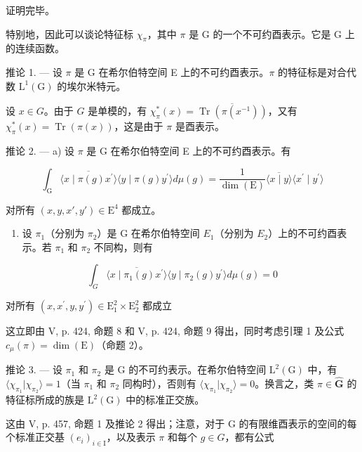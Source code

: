 证明完毕。

特别地，因此可以谈论特征标 \(\chi_{\pi}\)，其中 \(\pi\) 是 G 的一个不可约酉表示。它是 G 上的连续函数。

推论 1. --- 设 \(\pi\) 是 G 在希尔伯特空间 E 上的不可约酉表示。\(\pi\) 的特征标是对合代数 \(\mathrm{L}^{1}(\mathrm{G})\) 的埃尔米特元。

设 \(x \in G\)。由于 \(G\) 是单模的，有 \(\chi_{\pi}^{*}(x) = \overline{\operatorname{Tr}(\pi(x^{-1}))}\)，又有 \(\chi_{\pi}^{*}(x) = \operatorname{Tr}(\pi(x))\)，这是由于 \(\pi\) 是酉表示。

推论 2. --- a) 设 \(\pi\) 是 G 在希尔伯特空间 E 上的不可约酉表示。有

\[
\int_ {\mathrm{G}} \overline {{\langle x \mid \pi (g) x ^ {\prime} \rangle}} \langle y \mid \pi (g) y ^ {\prime} \rangle d \mu (g) = \frac {1}{\dim (\mathrm{E})} \overline {{\langle x \mid y \rangle}} \langle x ^ {\prime} \mid y ^ {\prime} \rangle
\]

对所有 \((x,y,x',y')\in \mathrm{E}^4\) 都成立。

\begin{enumerate}
\def\labelenumi{\alph{enumi})}
\setcounter{enumi}{1}
\tightlist
\item
  设 \(\pi_{1}\)（分别为 \(\pi_{2}\)）是 G 在希尔伯特空间 \(E_{1}\)（分别为 \(E_{2}\)）上的不可约酉表示。若 \(\pi_{1}\) 和 \(\pi_{2}\) 不同构，则有
\end{enumerate}

\[
\int_ {G} \overline {{\langle x \mid \pi_ {1} (g) x ^ {\prime} \rangle}} \langle y \mid \pi_ {2} (g) y ^ {\prime} \rangle d \mu (g) = 0
\]

对所有 \((x,x^{\prime},y,y^{\prime})\in \mathrm{E}_{1}^{2}\times \mathrm{E}_{2}^{2}\) 都成立

这立即由 V, p. 424, 命题 8 和 V, p. 424, 命题 9 得出，同时考虑引理 1 及公式 \(c_{\mu}(\pi) = \dim(\mathrm{E})\)（命题 2）。

推论 3. --- 设 \(\pi_1\) 和 \(\pi_2\) 是 G 的不可约表示。在希尔伯特空间 \(\mathrm{L}^{2}(\mathrm{G})\) 中，有 \(\langle \chi_{\pi_1} | \chi_{\pi_2} \rangle = 1\)（当 \(\pi_1\) 和 \(\pi_2\) 同构时），否则有 \(\langle \chi_{\pi_1} | \chi_{\pi_2} \rangle = 0\)。换言之，类 \(\pi \in \widehat{\mathbf{G}}\) 的特征标所成的族是 \(\mathrm{L}^{2}(\mathrm{G})\) 中的标准正交族。

这由 V, p. 457, 命题 1 及推论 2 得出；注意，对于 G 的有限维酉表示的空间的每个标准正交基 \((e_{i})_{i\in\mathrm{I}}\)，以及表示 \(\pi\) 和每个 \(g\in G\)，都有公式

